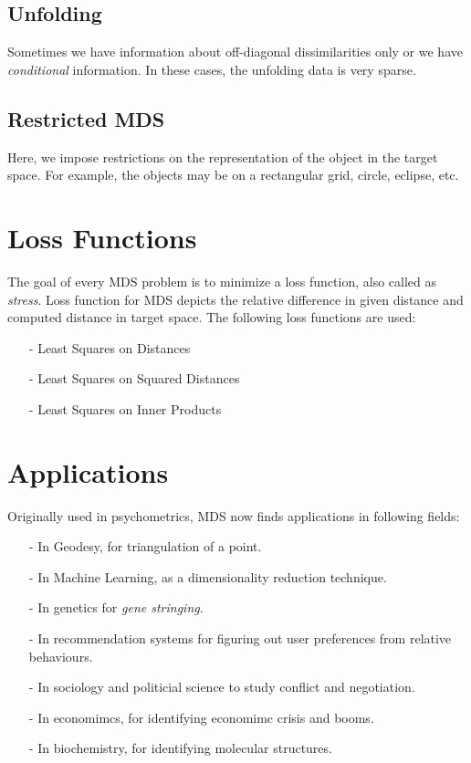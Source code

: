 \documentclass[12pt]{article}
\begin{document}
\subsection*{Unfolding}
Sometimes we have information about off-diagonal dissimilarities only or we
have \textit{conditional} information. In these cases, the unfolding data is very sparse.
\subsection*{Restricted MDS}
Here, we impose restrictions on the representation of the object in the target
space. For example, the objects may be on a rectangular grid, circle, eclipse,
etc.

\section*{Loss Functions}
The goal of every MDS problem is to minimize a loss function, also called as
\textit{stress}. Loss function for MDS depicts the relative difference in given
distance and computed distance in target space. The following loss functions are used:
\begin{itemize}
    \item [-] Least Squares on Distances
    \item [-] Least Squares on Squared Distances
    \item [-] Least Squares on Inner Products
\end{itemize}

\section*{Applications}
Originally used in psychometrics, MDS now finds applications in following fields:
\begin{itemize}
    \item[-] In Geodesy, for triangulation of a point.
    \item[-] In Machine Learning, as a dimensionality reduction technique.
    \item[-] In genetics for \textit{gene stringing}.
    \item[-] In recommendation systems for figuring out user preferences from relative behaviours.
    \item[-] In sociology and politicial science to study conflict and negotiation.
    \item[-] In economimcs, for identifying economimc crisis and booms.
    \item[-] In biochemistry, for identifying molecular structures.
\end{itemize}
\end{document}
